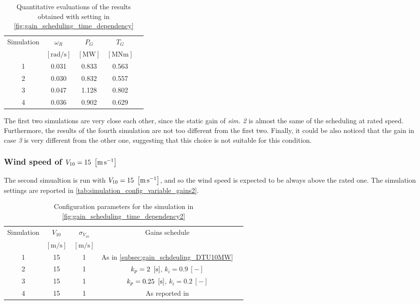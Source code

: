 \begin{table}[htb]
  \caption{Quantitative evaluations of the results obtained with setting in \autoref{fig:gain_scheduling_time_dependency}}
  \centering
  \begin{tabular}{ccccc}
  \toprule
    Simulation & $\omega_R$  & $P_G$ & $T_G$ \\ 
     & $\left[\si{\radian\per\second}\right]$ & $\left[\si{\mega\watt}\right]$ &$\left[\si{\mega\newton\meter}\right]$ \\ \midrule       
     1 & 0.031 & 0.833 & 0.563 \\
     2 & 0.030 & 0.832 & 0.557 \\
     3 & 0.047 & 1.128 & 0.802 \\
     4 & 0.036 & 0.902 & 0.629 \\
     \bottomrule
  \end{tabular}
  \label{tab:res_variable_gains}
\end{table}
The first two simulations are very close each other, since the static gain of \textit{sim. 2} is almost the same of the scheduling at rated speed. Furthermore, the results of the fourth simulation are not too different from the first two. Finally, it could be also noticed that the gain in case \textit{3} is very different from the other one, suggesting that this choice is not suitable for this condition. 

\subsubsection{Wind speed of $V_{10}=15 \ \left[\si{\meter\per\second}\right]$}
The second simualtion is run with $V_{10}=15 \ \left[\si{\meter\per\second}\right]$, and so the wind speed is expected to be always above the rated one. The simulation settings are reported in \autoref{tab:simulation_config_variable_gains2}.
\begin{table}[htb]
  \caption{Configuration parameters for the simulation in \autoref{fig:gain_scheduling_time_dependency2}}
  \centering
  \begin{tabular}{ccccc}
  \toprule
    Simulation & $V_{10}$  & $\sigma_{V_{10}}$ & Gains schedule \\ 
     & $\left[\si{\meter\per\second}\right]$ & $\left[\si{\meter\per\second}\right]$ & \\ \midrule       
     1 & 15 & 1 & As in \autoref{subsec:gain_schdeuling_DTU10MW}  \\
     2 & 15 & 1 & $k_p = 2 \ \mesunt{\second}$, $k_i=0.9 \ [-]$ \\
     3 & 15 & 1 & $k_p = 0.25 \ \mesunt{\second}$, $k_i=0.2 \ [-]$  \\
     4 & 15 & 1 & As reported in \cite{Olimpo_Anaya‐Lara}  \\
     \bottomrule
  \end{tabular}
  \label{tab:simulation_config_variable_gains2}
\end{table}

